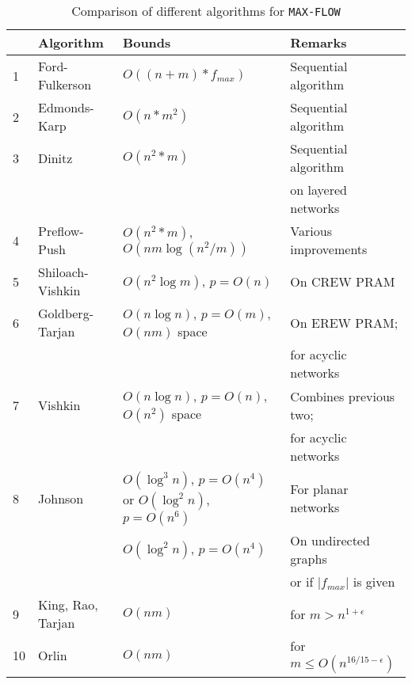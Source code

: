 \documentclass[a4paper,10pt, twocolumn]{article}
\begin{document}
\begin{table*}
\begin{center}
\begin{tabular}{llll}
\hline
&\textbf{Algorithm} & \textbf{Bounds} & \textbf{Remarks} \\
\hline
1 & Ford-Fulkerson~\cite{ahuja93} & $O((n+m) * f_{max})$ & Sequential algorithm \\
2 & Edmonds-Karp~\cite{ahuja93} & $O(n*m^2)$ & Sequential algorithm  \\
3 & Dinitz~\cite{dinitz70}& $O(n^2*m)$ & Sequential algorithm \\
  & & & on layered networks\\
4 & Preflow-Push~\cite{ahuja93} & $O(n^2*m)$, $O(nm \log(n^2/m))$ & Various improvements\\
5 & Shiloach-Vishkin~\cite{yossi81} & $O(n^2 \log m)$, $p=O(n)$ & On CREW PRAM\\
6 & Goldberg-Tarjan~\cite{goldberg89} & $O(n \log n)$, $p=O(m)$, $O(nm)$ space & On EREW PRAM; \\ 
  & & & for acyclic networks \\
7 & Vishkin~\cite{vishkin92} & $O(n \log n)$, $p=O(n)$, $O(n^2)$ space & Combines previous two;\\ 
  & & & for acyclic networks\\
8 & Johnson~\cite{johnson87} & $O(\log^{3} n)$, $p=O(n^{4})$ or $O(\log^{2} n)$, $p=O(n^{6})$ &
For planar networks\\
  & & $	O(\log^{2} n)$, $p=O(n^{4})$ & On undirected graphs \\
  & & & or if  $\lvert f_{max} \rvert$ is given\\
9 & King, Rao, Tarjan~\cite{King94} & $O(nm)$ & for $m > n^{1+\epsilon}$ \\
10 & Orlin~\cite{Orlin13} & $O(nm)$ & for $m \leq O(n^{16/15 - \epsilon})$ \\
\hline
\end{tabular}
\caption{Comparison of different algorithms for \lstinline|MAX-FLOW|}
\label{tbl:results}
\end{center}
\end{table*}
\end{document}
